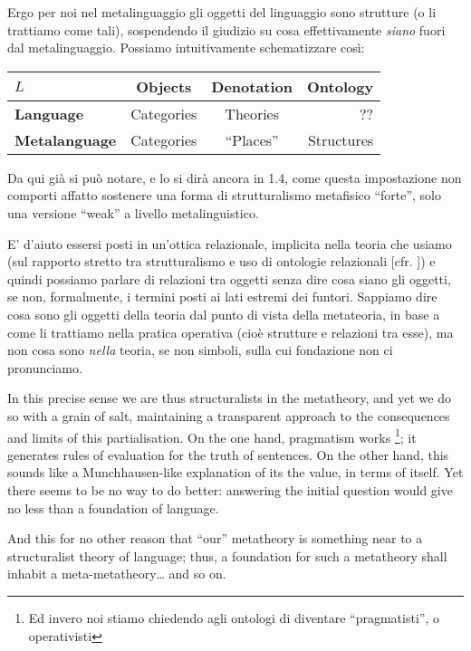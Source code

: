 \begin{remark}
	Ergo per noi nel metalinguaggio gli oggetti del linguaggio sono strutture (o li trattiamo come tali), sospendendo il giudizio su cosa effettivamente \emph{siano} fuori dal metalinguaggio. Possiamo intuitivamente schematizzare così:
	\begin{center}
		\begin{tabular}{lccr}\toprule
			$L$ & Objects & Denotation & Ontology \\
			\midrule
			\textbf{Language} & Categories & Theories & ?? \\
			\midrule
			\textbf{Metalanguage} & Categories & ``Places'' & Structures
		\end{tabular}
	\end{center}
	Da qui già si può notare, e lo si dirà ancora in 1.4, come questa impostazione non comporti affatto sostenere una forma di strutturalismo metafisico ``forte'', solo una versione ``weak'' a livello metalinguistico.
	
	E' d'aiuto essersi posti in un'ottica relazionale, implicita nella teoria che usiamo (sul rapporto stretto tra strutturalismo e uso di ontologie relazionali [cfr. \cite{??}]) e quindi possiamo parlare di relazioni tra oggetti senza dire cosa siano gli oggetti, se non, formalmente, i termini posti ai lati estremi dei funtori. Sappiamo dire cosa sono gli oggetti della teoria dal punto di vista della metateoria, in base a come li trattiamo nella pratica operativa (cioè strutture e relazioni tra esse), ma non cosa sono \textit{nella} teoria, se non simboli, sulla cui fondazione non ci pronunciamo.
\end{remark}


In this precise sense we are thus structuralists in the metatheory, and yet we do so with a grain of salt, maintaining a transparent approach to the consequences and limits of this partialisation. On the one hand, pragmatism works \footnote{Ed invero noi stiamo chiedendo agli ontologi di diventare ``pragmatisti'', o operativisti}; it generates rules of evaluation for the truth of sentences. On the other hand, this sounds like a Munchhausen-like explanation of its the value, in terms of itself. Yet there seems to be no way to do better: answering the initial question would give no less than a foundation of language.

And this for no other reason that ``our'' metatheory is something near to a structuralist theory of language; thus, a foundation for such a metatheory shall inhabit a meta-metatheory\dots{} and so on.

